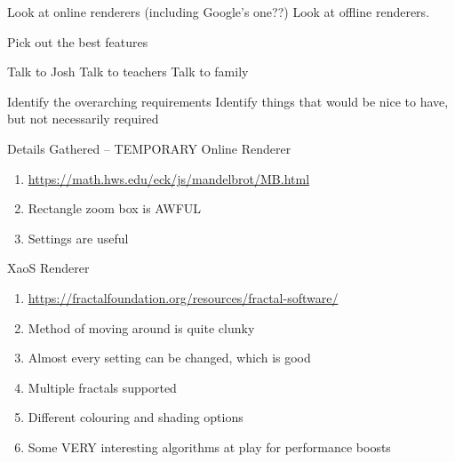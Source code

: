 Look at online renderers (including Google's one??)
Look at offline renderers.

Pick out the best features

Talk to Josh
Talk to teachers
Talk to family

Identify the overarching requirements
Identify things that would be nice to have, but not necessarily required

\begin{redbox}{Details Gathered -- TEMPORARY}
	Online Renderer
	\begin{enumerate}
		\item {	\href{https://math.hws.edu/eck/js/mandelbrot/MB.html}{https://math.hws.edu/eck/js/mandelbrot/MB.html} }
		\item { Rectangle zoom box is AWFUL }
		\item { Settings are useful }
	\end{enumerate}
	
	XaoS Renderer
	\begin{enumerate}
		\item {	\href{https://fractalfoundation.org/resources/fractal-software/}{https://fractalfoundation.org/resources/fractal-software/} }
		\item { Method of moving around is quite clunky }
		\item { Almost every setting can be changed, which is good }
		\item { Multiple fractals supported }
		\item { Different colouring and shading options }
		\item { Some VERY interesting algorithms at play for performance boosts }
		
		
		
		
		
	\end{enumerate}
	
\end{redbox}
